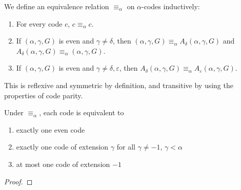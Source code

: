 \begin{definition}
\label {def:code-equiv}
\leanok
We define an equivalence relation $\equiv_\alpha$ on $\alpha$-codes inductively:
\begin{enumerate}
\item For every code $c$, $c \equiv_\alpha c$.
\item If $(\alpha,\gamma,G)$ is even and $\gamma \neq \delta$, then $(\alpha,\gamma,G) \equiv_\alpha A_\delta (\alpha,\gamma,G)$ and $A_\delta (\alpha,\gamma,G) \equiv_\alpha (\alpha,\gamma,G)$.
\item If $(\alpha,\gamma,G)$ is even and $\gamma \neq \delta, \varepsilon$, then $A_\delta (\alpha,\gamma,G) \equiv_\alpha A_\varepsilon (\alpha,\gamma,G)$.
\end{enumerate}

This is reflexive and symmetric by definition, and transitive by using the properties of code parity.
\end{definition}

\begin{lemma}
\label{lem:code-equiv-properties}
\leanok
{}
Under $\equiv_\alpha$, each code is equivalent to
\begin{enumerate}
\item exactly one even code
\item exactly one code of extension $\gamma$ for all $\gamma \ne -1$, $\gamma < \alpha$
\item at most one code of extension $-1$
\end{enumerate}
\end{lemma}
\begin{proof}
\leanok
\end{proof}


